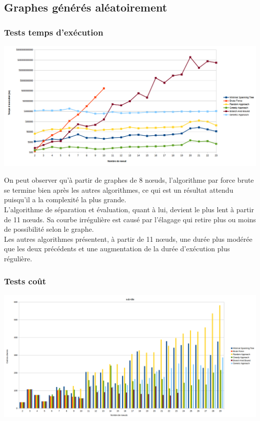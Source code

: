 \documentclass[10pt,a4paper]{report}
\begin{document}
	\subsection{Graphes générés aléatoirement}
		\subsubsection{Tests temps d'exécution}
			\includegraphics[scale=0.45]{./Ressource/temps_graphes_random.png}
			
			\begin{flushleft}
			On peut observer qu'à partir de graphes de 8 nœuds, l'algorithme par force brute se termine bien après les autres algorithmes, ce qui est un résultat attendu puisqu'il a la complexité la plus grande.\\
			L'algorithme de séparation et évaluation, quant à lui, devient le plus lent à partir de 11 nœuds. Sa courbe irrégulière est causé par l'élagage qui retire plus ou moins de possibilité selon le graphe.\\
			Les autres algorithmes présentent, à partir de 11 nœuds, une durée plus modérée que les deux précédents et une augmentation de la durée d'exécution plus régulière.
			\end{flushleft}
		
		\subsubsection{Tests coût}
			
			\includegraphics[scale=0.40]{./Ressource/cout_graphes_random.png}
			
\end{document}

